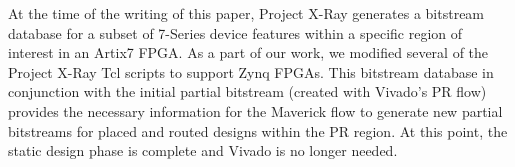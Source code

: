 At the time of the writing of this paper, Project X-Ray generates a bitstream database for a subset of 7-Series device features within a specific region of interest in an Artix7 FPGA.
As a part of our work, we modified several of the Project X-Ray Tcl scripts to support Zynq FPGAs.
This bitstream database in conjunction with the initial partial bitstream (created with Vivado's PR flow) provides the necessary information for the Maverick flow to generate new partial bitstreams for placed and routed designs within the PR region.
At this point, the static design phase is complete and Vivado is no longer needed.
